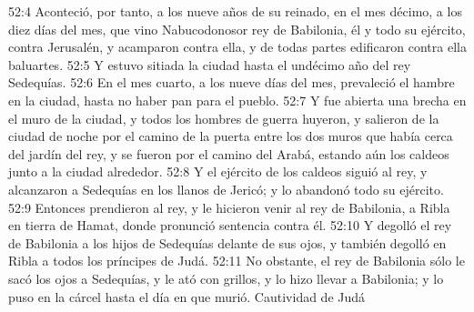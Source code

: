 52:4 Aconteció, por tanto, a los nueve años de su reinado, en el mes décimo, a los diez días del mes, que vino Nabucodonosor rey de Babilonia, él y todo su ejército, contra Jerusalén, y acamparon contra ella, y de todas partes edificaron contra ella baluartes.  
52:5 Y estuvo sitiada la ciudad hasta el undécimo año del rey Sedequías.  
52:6 En el mes cuarto, a los nueve días del mes, prevaleció el hambre en la ciudad, hasta no haber pan para el pueblo.  
52:7 Y fue abierta una brecha en el muro de la ciudad, y todos los hombres de guerra huyeron, y salieron de la ciudad de noche por el camino de la puerta entre los dos muros que había cerca del jardín del rey, y se fueron por el camino del Arabá, estando aún los caldeos junto a la ciudad alrededor.  
52:8 Y el ejército de los caldeos siguió al rey, y alcanzaron a Sedequías en los llanos de Jericó; y lo abandonó todo su ejército.  
52:9 Entonces prendieron al rey, y le hicieron venir al rey de Babilonia, a Ribla en tierra de Hamat, donde pronunció sentencia contra él.  
52:10 Y degolló el rey de Babilonia a los hijos de Sedequías delante de sus ojos, y también degolló en Ribla a todos los príncipes de Judá.  
52:11 No obstante, el rey de Babilonia sólo le sacó los ojos a Sedequías, y le ató con grillos, y lo hizo llevar a Babilonia; y lo puso en la cárcel hasta el día en que murió.  
Cautividad de Judá  
  
